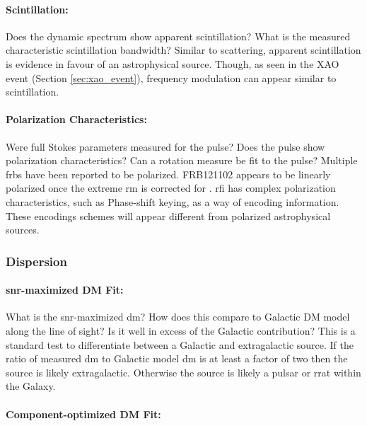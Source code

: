 \documentclass[a4paper,fleqn,usenatbib]{mnras}
\begin{document}
\paragraph{Scintillation:}

Does the dynamic spectrum show apparent scintillation? What is the measured
characteristic scintillation bandwidth? Similar to scattering, apparent
scintillation is evidence in favour of an astrophysical source. Though, as seen
in the XAO event (Section \ref{sec:xao_event}), frequency modulation can appear
similar to scintillation.

\paragraph{Polarization Characteristics:}

Were full Stokes parameters measured for the pulse? Does the pulse show
polarization characteristics? Can a rotation measure be fit to the pulse?
Multiple \glspl{frb} have been reported to be polarized.  FRB121102 appears to
be linearly polarized once the extreme \gls{rm} is corrected for
\citep{2018Natur.553..182M}.  \gls{rfi} has complex polarization
characteristics, such as Phase-shift keying, as a way of encoding information.
These encodings schemes will appear different from polarized astrophysical
sources.

\subsubsection{Dispersion}

\paragraph{\gls{snr}-maximized DM Fit:}

What is the \gls{snr}-maximized \gls{dm}? How does this compare to Galactic DM
model along the line of sight? Is it well in excess of the Galactic
contribution? This is a standard test to differentiate between a Galactic and
extragalactic source. If the ratio of measured \gls{dm} to Galactic model
\gls{dm} is at least a factor of two then the source is likely extragalactic.
Otherwise the source is likely a pulsar or \gls{rrat} within the Galaxy.

\paragraph{Component-optimized DM Fit:}
\end{document}
